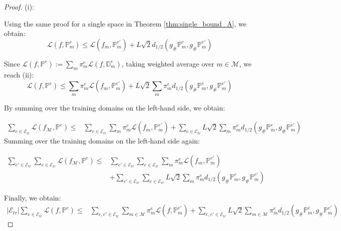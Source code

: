 \begin{proof}(i):

Using the same proof
for a single space in Theorem \ref{thm:single_bound_A}, we obtain:
\begin{equation} \mathcal{L}\left(f,\mathbb{P}^{e}_m\right)
\leq
\mathcal{L}\left(f_m,\mathcal{\mathbb{P}}_{m}^{e'}\right)
+ 
L\sqrt{2} d_{1/2}\left(g_{\#}\mathbb{P}^{e}_{m},g_{\#}\mathbb{P}_{m}^{e'}\right)
\end{equation}

Since $\mathcal{L}\left(f,\mathbb{P}^{e}\right):= \sum_{m}\pi^{e}_m \mathcal{L}\left(f,\mathbb{D}_{m}^{e}\right)$, taking weighted average over $m\in \mathcal{M}$, we reach (ii):
\begin{equation}
\mathcal{L}\left(f,\mathbb{P}^{e}\right)
\leq
\sum_{m}\pi^{e}_m
\mathcal{L}\left(f_m,\mathbb{P}_{m}^{e'}\right)
+ 
L\sqrt{2}\sum_{m}\pi^{e}_m d_{1/2}\left(g_{\#}\mathbb{P}^{e}_{m},g_{\#}\mathbb{P}_{m}^{e'}\right)
\end{equation}

By summing over the training domains on the left-hand side, we obtain:

\begin{align} \sum_{e\in\mathcal{E}_{tr}}\mathcal{L}\left(f_{\mathcal{M}},\mathbb{P}^{e}\right)
\leq&
\sum_{e\in\mathcal{E}_{tr}}\sum_{m}\pi^{e}_m
\mathcal{L}\left(f_m,\mathbb{P}_{m}^{e'}\right)
+ 
\sum_{e\in\mathcal{E}_{tr}}L\sqrt{2}\sum_{m}\pi^{e}_m d_{1/2}\left(g_{\#}\mathbb{P}^{e}_{m},g_{\#}\mathbb{P}_{m}^{e'}\right) \nonumber
\end{align}
Summing over the training domains on the left-hand side again:

\begin{align}
\sum_{e'\in\mathcal{E}_{tr}}\sum_{e\in\mathcal{E}_{tr}}\mathcal{L}\left(f_{\mathcal{M}},\mathbb{P}^{e}\right)
\leq&
\sum_{e'\in\mathcal{E}_{tr}}\sum_{e\in\mathcal{E}_{tr}}\sum_{m}\pi^{e}_m
\mathcal{L}\left(f_m,\mathbb{P}_{m}^{e'}\right)\nonumber\\
&+ 
\sum_{e'\in\mathcal{E}_{tr}}\sum_{e\in\mathcal{E}_{tr}}L\sqrt{2}\sum_{m}\pi^{e}_m d_{1/2}\left(g_{\#}\mathbb{P}^{e}_{m},g_{\#}\mathbb{P}_{m}^{e'}\right)\nonumber
\end{align}

Finally, we obtain:
\begin{align}
\left | \mathcal{E}_{tr} \right | \sum_{e\in \mathcal{E}_{tr}}\mathcal{L}\left(f,\mathbb{P}^{e}\right)
\leq&
\sum_{e,e'\in \mathcal{E}_{tr}}\sum_{m\in\mathcal{M}}\pi^{e}_m
\mathcal{L}\left(f,\mathcal{\mathbb{P}}_{m}^{e'}\right)
+
\sum_{e,e'\in \mathcal{E}_{tr}}L\sqrt{2}\sum_{m\in\mathcal{M}}\pi^{e}_{m} d_{1/2}\left(g_{\#}\mathbb{P}^{e}_{m},g_{\#}\mathbb{P}_{m}^{e'}\right)
\end{align}
\end{proof}


